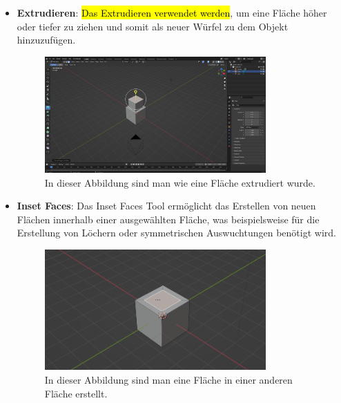 \begin{itemize}
    \item \textbf{Extrudieren}:
    \indent \hl{Das Extrudieren verwendet werden}, um eine Fläche höher oder tiefer zu ziehen und somit als neuer Würfel zu dem Objekt hinzuzufügen.
    \begin{figure}[H]
        \centering
        \includegraphics[width=0.8\textwidth]{chapters/13/images/ExtrudeTool.png}
        \caption{In dieser Abbildung sind man wie eine Fläche extrudiert wurde.}
        \label{UST-9}
    \end{figure}
    
    \item \textbf{Inset Faces}:
    \indent Das Inset Faces Tool ermöglicht das Erstellen von neuen Flächen innerhalb einer ausgewählten Fläche, was beispielsweise für die Erstellung von Löchern oder symmetrischen Auswuchtungen benötigt wird.
    \begin{figure}[H]
        \centering
        \includegraphics[width=0.8\textwidth]{chapters/13/images/InsetFace.png}
        \caption{In dieser Abbildung sind man eine Fläche in einer anderen Fläche erstellt.}
        \label{UST-10}
    \end{figure}
    

\end{itemize}
